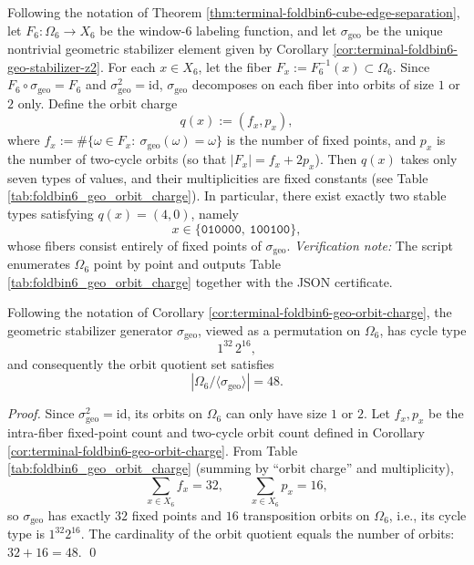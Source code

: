 \begin{corollary}\label{cor:terminal-foldbin6-geo-orbit-charge}
Following the notation of Theorem \ref{thm:terminal-foldbin6-cube-edge-separation}, let \(F_6:\Omega_6\to X_6\) be the window-\(6\) labeling function, and let \(\sigma_{\mathrm{geo}}\) be the unique nontrivial geometric stabilizer element given by Corollary \ref{cor:terminal-foldbin6-geo-stabilizer-z2}.
For each \(x\in X_6\), let the fiber \(F_x:=F_6^{-1}(x)\subset\Omega_6\).
Since \(F_6\circ\sigma_{\mathrm{geo}}=F_6\) and \(\sigma_{\mathrm{geo}}^2=\mathrm{id}\), \(\sigma_{\mathrm{geo}}\) decomposes on each fiber into orbits of size \(1\) or \(2\) only.
Define the orbit charge
\[
q(x):=(f_x,p_x),
\]
where \(f_x:=\#\{\omega\in F_x:\ \sigma_{\mathrm{geo}}(\omega)=\omega\}\) is the number of fixed points, and \(p_x\) is the number of two-cycle orbits (so that \(|F_x|=f_x+2p_x\)).
Then \(q(x)\) takes only seven types of values, and their multiplicities are fixed constants (see Table \ref{tab:foldbin6_geo_orbit_charge}).
In particular, there exist exactly two stable types satisfying \(q(x)=(4,0)\), namely
\[
x\in\{\texttt{010000},\ \texttt{100100}\},
\]
whose fibers consist entirely of fixed points of \(\sigma_{\mathrm{geo}}\).
\emph{Verification note:} The script \texttt{} enumerates \(\Omega_6\) point by point and outputs Table \ref{tab:foldbin6_geo_orbit_charge} together with the JSON certificate.
\end{corollary}


\begin{corollary}\label{cor:terminal-foldbin6-geo-cycle-quotient-48}
Following the notation of Corollary \ref{cor:terminal-foldbin6-geo-orbit-charge},
the geometric stabilizer generator \(\sigma_{\mathrm{geo}}\), viewed as a permutation on \(\Omega_6\), has cycle type
\[
1^{32}\,2^{16},
\]
and consequently the orbit quotient set satisfies
\[
|\Omega_6/\langle\sigma_{\mathrm{geo}}\rangle|=48.
\]
\end{corollary}
\begin{proof}
Since \(\sigma_{\mathrm{geo}}^2=\mathrm{id}\), its orbits on \(\Omega_6\) can only have size \(1\) or \(2\).
Let \(f_x,p_x\) be the intra-fiber fixed-point count and two-cycle orbit count defined in Corollary \ref{cor:terminal-foldbin6-geo-orbit-charge}.
From Table \ref{tab:foldbin6_geo_orbit_charge} (summing by ``orbit charge'' and multiplicity),
\[
\sum_{x\in X_6} f_x=32,\qquad \sum_{x\in X_6} p_x=16,
\]
so \(\sigma_{\mathrm{geo}}\) has exactly \(32\) fixed points and \(16\) transposition orbits on \(\Omega_6\), i.e., its cycle type is \(1^{32}2^{16}\).
The cardinality of the orbit quotient equals the number of orbits: \(32+16=48\). \qed
\end{proof}

